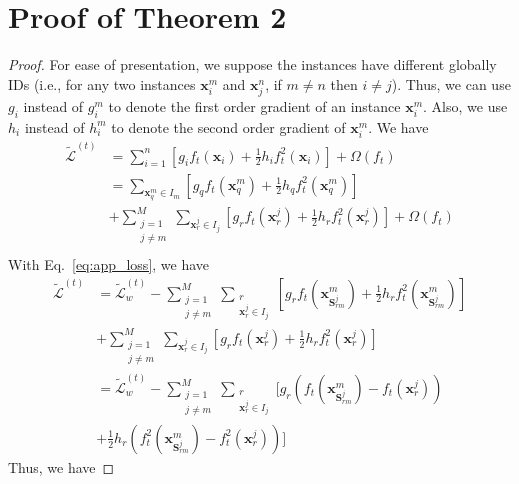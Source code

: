 \documentclass[letterpaper]{article} %
\theoremstyle{definition}
\newcommand{\mtx}[1]{\ensuremath{\mathbf{#1}}}
\begin{document}
\section{Proof of Theorem 2}
\begin{proof}
    For ease of presentation, we suppose the instances have different globally IDs (i.e., for any two instances $\mathbf{x}_i^m$ and $\mathbf{x}_j^n$, if $m\neq n$ then $i\neq j$). Thus, we can use $g_i$ instead of $g_i^m$ to denote the first order gradient of an instance $\mathbf{x}_i^m$. Also, we use $h_i$ instead of $h_i^m$ to denote the second order gradient of $\mathbf{x}_i^m$. We have
\begin{equation}
\begin{aligned}
    \mathcal{\tilde{L}}^{(t)} &= \sum_{i=1}^{n} [g_i f_t(\mathbf{x}_i)+\frac{1}{2}h_i f_t^2(\mathbf{x}_i)]+\Omega(f_t)\\
    &= \sum_{\mathbf{x}_q^m\in I_m}[g_q f_t(\mathbf{x}_q^m)+\frac{1}{2} h_q f_t^2(\mathbf{x}_q^m)] \\
    & +\sum_{\substack{j=1\\j\neq m}}^M\sum_{\mathbf{x}_r^j \in I_j}[g_r f_t(\mathbf{x}_r^j)+\frac{1}{2} h_r f_t^2(\mathbf{x}_r^j)] + \Omega(f_t)\\
\end{aligned}
\end{equation}  
With Eq.~\eqref{eq:app_loss}, we have
\begin{equation}
\begin{aligned}
     \mathcal{\tilde{L}}^{(t)}&=\mathcal{\tilde{L}}_w^{(t)} - \sum_{\substack{j=1\\j\neq m}}^M\sum_{\substack{r\\\mathbf{x}_r^j\in I_j}}[g_r f_t(\mathbf{x}_{\mtx{S}_{rm}^j}^m) +\frac{1}{2}h_rf_t^2(\mathbf{x}_{\mtx{S}_{rm}^j}^m)]  \\
    &  +\sum_{\substack{j=1\\j\neq m}}^M\sum_{\mathbf{x}_r^j \in I_j}[g_r f_t(\mathbf{x}_r^j)+\frac{1}{2} h_r f_t^2(\mathbf{x}_r^j)]\\
    &=\mathcal{\tilde{L}}_w^{(t)} - \sum_{\substack{j=1\\j\neq m}}^M\sum_{\substack{r\\\mathbf{x}_r^j\in I_j}}[g_r (f_t(\mathbf{x}_{\mtx{S}_{rm}^j}^m) - f_t(\mathbf{x}_r^j)) \\
    &+\frac{1}{2}h_r(f_t^2(\mathbf{x}_{\mtx{S}_{rm}^j}^m)-f_t^2(\mathbf{x}_r^j))]
\end{aligned}
\end{equation}
Thus, we have

\end{proof}
\end{document}
